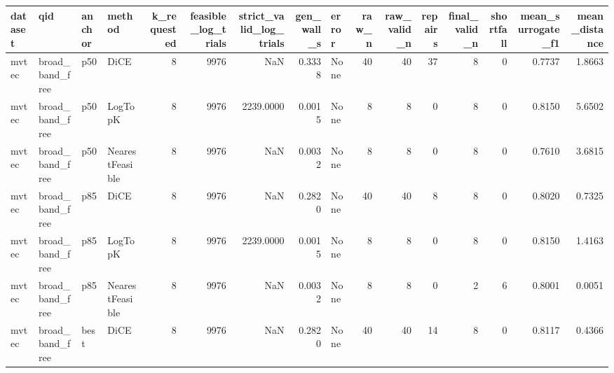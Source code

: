 \begin{tabular}{llllrrrrlrrrrrrr}
\toprule
dataset &                  qid & anchor &          method &  k\_requested &  feasible\_log\_trials &  strict\_valid\_log\_trials &  gen\_wall\_s &                                              error &  raw\_n &  raw\_valid\_n &  repairs &  final\_valid\_n &  shortfall &  mean\_surrogate\_f1 &  mean\_distance \\
\midrule
  mvtec &      broad\_band\_free &    p50 &            DiCE &            8 &                 9976 &                      NaN &      0.3338 &                                               None &     40 &           40 &       37 &              8 &          0 &             0.7737 &         1.8663 \\
  mvtec &      broad\_band\_free &    p50 &         LogTopK &            8 &                 9976 &                2239.0000 &      0.0015 &                                               None &      8 &            8 &        0 &              8 &          0 &             0.8150 &         5.6502 \\
  mvtec &      broad\_band\_free &    p50 & NearestFeasible &            8 &                 9976 &                      NaN &      0.0032 &                                               None &      8 &            8 &        0 &              8 &          0 &             0.7610 &         3.6815 \\
  mvtec &      broad\_band\_free &    p85 &            DiCE &            8 &                 9976 &                      NaN &      0.2820 &                                               None &     40 &           40 &        8 &              8 &          0 &             0.8020 &         0.7325 \\
  mvtec &      broad\_band\_free &    p85 &         LogTopK &            8 &                 9976 &                2239.0000 &      0.0015 &                                               None &      8 &            8 &        0 &              8 &          0 &             0.8150 &         1.4163 \\
  mvtec &      broad\_band\_free &    p85 & NearestFeasible &            8 &                 9976 &                      NaN &      0.0032 &                                               None &      8 &            8 &        0 &              2 &          6 &             0.8001 &         0.0051 \\
  mvtec &      broad\_band\_free &   best &            DiCE &            8 &                 9976 &                      NaN &      0.2820 &                                               None &     40 &           40 &       14 &              8 &          0 &             0.8117 &         0.4366 \\

\end{tabular}
